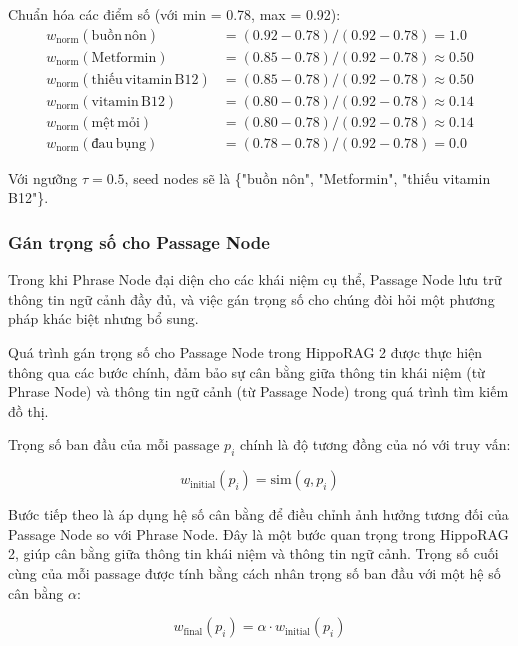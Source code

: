 \documentclass[../main.tex]{subfiles}
\begin{document}
Chuẩn hóa các điểm số (với min = 0.78, max = 0.92):
\begin{align}
w_{\mathrm{norm}}(\mathrm{buồn\,nôn}) &= (0.92-0.78)/(0.92-0.78) = 1.0 \\
w_{\mathrm{norm}}(\mathrm{Metformin}) &= (0.85-0.78)/(0.92-0.78) \approx 0.50 \\
w_{\mathrm{norm}}(\mathrm{thiếu\,vitamin\,B12}) &= (0.85-0.78)/(0.92-0.78) \approx 0.50 \\
w_{\mathrm{norm}}(\mathrm{vitamin\,B12}) &= (0.80-0.78)/(0.92-0.78) \approx 0.14 \\
w_{\mathrm{norm}}(\mathrm{mệt\,mỏi}) &= (0.80-0.78)/(0.92-0.78) \approx 0.14 \\
w_{\mathrm{norm}}(\mathrm{đau\,bụng}) &= (0.78-0.78)/(0.92-0.78) = 0.0
\end{align}

Với ngưỡng \(\tau = 0.5\), seed nodes sẽ là \{"buồn nôn", "Metformin", "thiếu vitamin B12"\}.
\subsubsection{Gán trọng số cho Passage Node}

Trong khi Phrase Node đại diện cho các khái niệm cụ thể, Passage Node lưu trữ thông tin ngữ cảnh đầy đủ, và việc gán trọng số cho chúng đòi hỏi một phương pháp khác biệt nhưng bổ sung.

Quá trình gán trọng số cho Passage Node trong HippoRAG 2 được thực hiện thông qua các bước chính, đảm bảo sự cân bằng giữa thông tin khái niệm (từ Phrase Node) và thông tin ngữ cảnh (từ Passage Node) trong quá trình tìm kiếm đồ thị.

Trọng số ban đầu của mỗi passage \(p_i\) chính là độ tương đồng của nó với truy vấn:

\begin{equation}
w_{\text{initial}}(p_i) = \text{sim}(q, p_i)
\end{equation}

Bước tiếp theo là áp dụng hệ số cân bằng để điều chỉnh ảnh hưởng tương đối của Passage Node so với Phrase Node. Đây là một bước quan trọng trong HippoRAG 2, giúp cân bằng giữa thông tin khái niệm và thông tin ngữ cảnh. Trọng số cuối cùng của mỗi passage được tính bằng cách nhân trọng số ban đầu với một hệ số cân bằng \(\alpha\):

\begin{equation}
w_{\text{final}}(p_i) = \alpha \cdot w_{\text{initial}}(p_i)
\end{equation}
\end{document}
